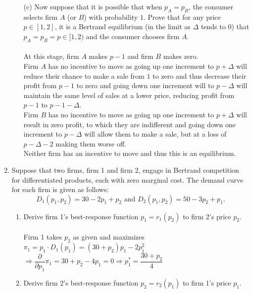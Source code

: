\documentclass[11pt]{article}
\begin{document}
\begin{enumerate}
\begin{itemize}
	\item[(c)] Now suppose that it is possible that when $p_{A}=p_{B}$, the consumer selects firm $A$ (or $B$) with probability $1$. Prove that for any price $p\in[1,2]$, it is a Bertrand equilibrium (in the limit as $\Delta$ tends to $0$) that $p_{A}=p_{B}=p\in[1,2)$ and the consumer chooses firm $A$.\\\\
	At this stage, firm $A$ makes $p-1$ and firm $B$ makes zero.\\
	Firm $A$ has no incentive to move as going up one increment to $p+\Delta$ will reduce their chance to make a sale from $1$ to zero and thus decrease their profit from $p-1$ to zero and going down one increment will to $p-\Delta$ will maintain the same level of sales at a lower price, reducing profit from $p-1$ to $p-1-\Delta$.\\
    Firm $B$ has no incentive to move as going up one increment to $p+\Delta$ will result in zero profit, to which they are indifferent and going down one increment to $p-\Delta$ will allow them to make a sale, but at a loss of $p-\Delta-2$ making them worse off.\\
    Neither firm has an incentive to move and thus this is an equilibrium.\\
	\end{itemize}
\item Suppose that two firms, firm 1 and firm 2, engage in Bertrand competition for differentiated products, each with zero marginal cost. The demand curve for each firm is given as follows:
	\begin{equation*}
	D_{1}(p_{1},p_{2})=30-2p_{1}+p_{2}\text{ and }D_{2}(p_{1},p_{2})=50-3p_{2}+p_{1}.
	\end{equation*}
	\begin{enumerate}
	\item Derive firm 1's best-response function $p_{1}=r_{1}(p_{2})$ to firm 2's price $p_{2}$.
    \smallskip\\\\
    Firm 1 takes $p_2$ as given and maximizes\\
    $\pi_1=p_1\cdot D_1(p_1)=(30+p_2)p_1-2p_1^2$\\
    $\Rightarrow\dfrac{\partial}{\partial p_1}\pi_1=30+p_2-4p_1=0\Rightarrow p_1^*=\dfrac{30+p_2}{4}$
    \item Derive firm 2's best-response function $p_{2}=r_{2}(p_{1})$ to firm 1's price $p_{1}$.
    \smallskip\\\\

\end{enumerate}
\end{enumerate}
\end{document}
